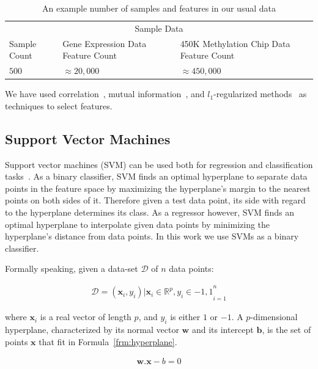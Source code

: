 \begin{table}[th!]
  \centering
  \begin{tabular}{p{} p{} p{}}
    \hline
    \multicolumn{3}{c}{Sample Data} \\
    \cline{1-3}
    Sample Count   & Gene Expression Data Feature Count & 450K Methylation Chip Data Feature Count \\
    \hline
    $500$      & $\approx 20,000$    & $\approx 450,000$   \\
    \hline
  \end{tabular}
  \caption{An example number of samples and features in our usual data}
  \label{tab:sample-sample-size}
\end{table}

We have used correlation~\cite{correlation}, mutual information~\cite{mutual-information}, and $l_1$-regularized methods~\cite{l1-regularized} as techniques to select features.

\subsection{Support Vector Machines}
\label{sec:svms}

Support vector machines (SVM) can be used both for regression and classification tasks~\cite{svm2, svr1}. As a binary classifier, SVM finds an optimal hyperplane to separate data points in the feature space by maximizing the hyperplane's margin to the nearest points on both sides of it. Therefore given a test data point, its side with regard to the hyperplane determines its class. As a regressor however, SVM finds an optimal hyperplane to interpolate given data points by minimizing the hyperplane's distance from data points. In this work we use SVMs as a binary classifier.

Formally speaking, given a data-set $\mathcal{D}$ of $n$ data points:

\begin{align}
  \mathcal{D}={(\mathbf{x}_i, y_i) | \mathbf{x}_i \in \mathbb{R}^p, y_i \in {-1, 1}}_{i=1}^{n}
\end{align}

where $\mathbf{x}_i$ is a real vector of length $p$, and $y_i$ is either $1$ or $-1$. A $p$-dimensional hyperplane, characterized by its normal vector $\mathbf{w}$ and its intercept $\mathbf{b}$, is the set of points $\mathbf{x}$ that fit in Formula~\ref{frm:hyperplane}.

\begin{align}
  \mathbf{w} . \mathbf{x} - b = 0
  \label{frm:hyperplane}
\end{align}

